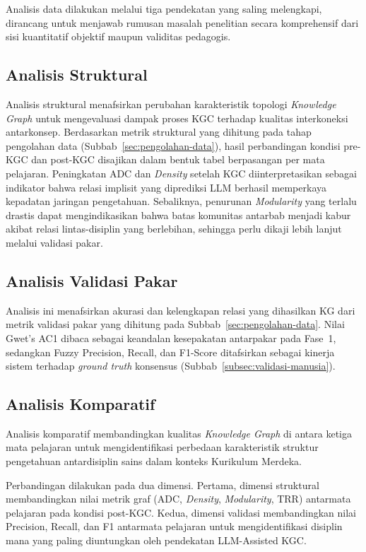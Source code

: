\documentclass[main]{subfiles}
\begin{document}
Analisis data dilakukan melalui tiga pendekatan yang saling melengkapi,
dirancang untuk menjawab rumusan masalah penelitian secara komprehensif
dari sisi kuantitatif objektif maupun validitas pedagogis.

\subsection{Analisis Struktural}

Analisis struktural menafsirkan perubahan karakteristik topologi
\textit{Knowledge Graph} untuk mengevaluasi dampak proses KGC terhadap
kualitas interkoneksi antarkonsep. Berdasarkan metrik struktural yang
dihitung pada tahap pengolahan data (Subbab~\ref{sec:pengolahan-data}),
hasil perbandingan kondisi pre-KGC dan post-KGC disajikan dalam bentuk
tabel berpasangan per mata pelajaran. Peningkatan ADC dan \textit{Density}
setelah KGC diinterpretasikan sebagai indikator bahwa relasi implisit
yang diprediksi LLM berhasil memperkaya kepadatan jaringan pengetahuan.
Sebaliknya, penurunan \textit{Modularity} yang terlalu drastis dapat
mengindikasikan bahwa batas komunitas antarbab menjadi kabur akibat
relasi lintas-disiplin yang berlebihan, sehingga perlu dikaji lebih
lanjut melalui validasi pakar.

\subsection{Analisis Validasi Pakar}

Analisis ini menafsirkan akurasi dan kelengkapan relasi yang dihasilkan KG
dari metrik validasi pakar yang dihitung pada Subbab~\ref{sec:pengolahan-data}.
Nilai Gwet's AC1 dibaca sebagai keandalan kesepakatan antarpakar pada Fase~1,
sedangkan Fuzzy Precision, Recall, dan F1-Score \parencite{harju_evaluating_2023}
ditafsirkan sebagai kinerja sistem terhadap \textit{ground truth} konsensus
(Subbab~\ref{subsec:validasi-manusia}).

\subsection{Analisis Komparatif}

Analisis komparatif membandingkan kualitas \textit{Knowledge Graph} di
antara ketiga mata pelajaran untuk mengidentifikasi perbedaan
karakteristik struktur pengetahuan antardisiplin sains dalam konteks
Kurikulum Merdeka.

Perbandingan dilakukan pada dua dimensi. Pertama, dimensi struktural
membandingkan nilai metrik graf (ADC, \textit{Density},
\textit{Modularity}, TRR) antarmata pelajaran pada kondisi post-KGC.
Kedua, dimensi validasi membandingkan nilai Precision, Recall, dan F1
antarmata pelajaran untuk mengidentifikasi disiplin mana yang paling
diuntungkan oleh pendekatan LLM-Assisted KGC.
\end{document}
